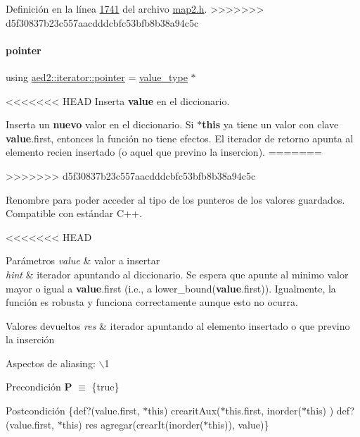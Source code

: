 Definición en la línea \hyperlink{map2_8h_source_l01741}{1741} del archivo \hyperlink{map2_8h_source}{map2.\+h}.
>>>>>>> d5f30837b23c557aacdddcbfc53bfb8b38a94c5c

\mbox{\label{classaed2_1_1iterator_a07466e8d020a80e2deb80364f28d4fa0_a07466e8d020a80e2deb80364f28d4fa0}} 
\paragraph{\texorpdfstring{pointer}{pointer}}
{\footnotesize\ttfamily using \hyperlink{classaed2_1_1iterator_a07466e8d020a80e2deb80364f28d4fa0_a07466e8d020a80e2deb80364f28d4fa0}{aed2\+::iterator\+::pointer} =  \hyperlink{classaed2_1_1iterator_a6411a2c08b2b7c52f063bef1a168acb6_a6411a2c08b2b7c52f063bef1a168acb6}{value\+\_\+type} $\ast$}

<<<<<<< HEAD
\-Inserta {\bfseries value} en el diccionario. 

\-Inserta un {\bfseries nuevo} valor en el diccionario. \-Si {\bfseries $\ast$this} ya tiene un valor con clave {\bfseries value}.first, entonces la función no tiene efectos. \-El iterador de retorno apunta al elemento recien insertado (o aquel que previno la insercion).
=======

>>>>>>> d5f30837b23c557aacdddcbfc53bfb8b38a94c5c

Renombre para poder acceder al tipo de los punteros de los valores guardados. Compatible con estándar C++. 

<<<<<<< HEAD
\begin{DoxyParams}{\-Parámetros}
{\em value} & valor a insertar \\
\hline
{\em hint} & iterador apuntando al diccionario. \-Se espera que apunte al minimo valor mayor o igual a {\bfseries value}.first (i.\-e., a lower\-\_\-bound({\bfseries value}.first)). \-Igualmente, la función es robusta y funciona correctamente aunque esto no ocurra. \\
\hline
\end{DoxyParams}

\begin{DoxyRetVals}{\-Valores devueltos}
{\em res} & iterador apuntando al elemento insertado o que previno la inserción\\
\hline
\end{DoxyRetVals}
\begin{DoxyParagraph}{\-Aspectos de aliasing\-:}
$\backslash$1
\end{DoxyParagraph}
\begin{DoxyPrecond}{\-Precondición}
{\bfseries \-P} $\equiv$ \{true\} 
\end{DoxyPrecond}
\begin{DoxyPostcond}{\-Postcondición}
\{def?(value.\-first, $\ast$this)  crearit\-Aux($\ast$this.first, inorder($\ast$this) )   def?(value.\-first, $\ast$this)  res  agregar(crear\-It(inorder($\ast$this)), value)\}
\end{DoxyPostcond}

